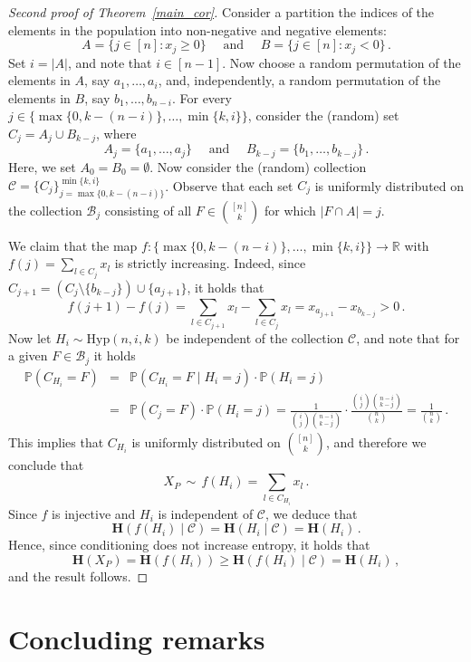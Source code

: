 \documentclass[11pt]{article}
\newcommand{\Prb}{\mathbb{P}}
\newcommand{\bh}{\mathbf{H}}
\begin{document}
\begin{proof}[Second proof of Theorem~\ref{main_cor}]
Consider a partition the indices of the elements in the population into non-negative and negative elements:
\[
A=\{j\in [n]: x_j \ge 0\} \quad\text{ and }\quad B = \{j\in [n] : x_j < 0\} \, .
\]
Set $i=|A|$, and note that $i\in [n-1]$. 
Now choose a random permutation of the elements in $A$, say $a_1,\ldots,a_i$, and, independently, a random permutation of the elements in $B$, say $b_1,\ldots,b_{n-i}$. 
For every $j\in\{\max\{0,k-(n-i)\},\dots,\min\{k,i\}\}$, consider the (random) set $C_j = A_j \cup B_{k-j}$, where 
\[
A_j = \{a_1,\ldots,a_j\} \quad \text{ and } \quad B_{k-j}=\{b_1,\ldots,b_{k-j}\} \, .
\]
Here, we set $A_0=B_{0}=\emptyset$.  
Now consider the (random) collection $\mathcal{C}= \{C_j\}_{j=\max\{0,k-(n-i)\}}^{\min\{k,i\}}$. 
Observe that each set $C_j$ is uniformly distributed on the collection 
$\mathcal{B}_j$ consisting of all $F\in\binom{[n]}{k}$ for which 
$|F\cap A|=j$. 

We claim that the map $f: \{\max\{0,k-(n-i)\},\dots,\min\{k,i\}\}\to \mathbb{R}$ with 
$f(j)= \sum_{l\in C_j}x_l$ is strictly increasing. Indeed, since $C_{j+1} = (C_j\setminus \{b_{k-j}\})\cup \{a_{j+1}\}$, it holds that 
\[
f(j+1)-f(j)=\sum_{l\in C_{j+1}}x_l - \sum_{l\in C_j}x_l = x_{a_{j+1}} - x_{b_{k-j}} > 0 \, .
\]
Now let $H_i\sim\text{Hyp}(n,i,k)$ be independent of the collection $\mathcal{C}$, and note that  for a given $F\in\mathcal{B}_j$ it holds 
\begin{eqnarray*}
\Prb(C_{H_i} = F) &=& \Prb(C_{H_i}= F \mid H_i=j)\cdot \Prb(H_i=j)\\ 
&=&  \Prb(C_{j}= F)\cdot \Prb(H_i=j)
 = \frac{1}{\binom{i}{j}\binom{n-i}{k-j}}\cdot \frac{\binom{i}{j}\binom{n-i}{k-j}}{\binom{n}{k}} = \frac{1}{\binom{n}{k}} \, .
\end{eqnarray*}
This implies that $C_{H_i}$ is uniformly distributed on $\binom{[n]}{k}$, and therefore we conclude that  
\[
X_P \,\sim\, f(H_i)= \sum_{l \in C_{H_i}}x_l \, .
\]
Since $f$ is injective and $H_i$ is independent of $\mathcal{C}$, we deduce that 
\[
\bh(f(H_i)\mid \mathcal{C}) = \bh(H_i\mid \mathcal{C}) = \bh(H_i) \, .
\]
Hence, since conditioning does not increase entropy, it holds that  
\[
\bh(X_P) = \bh(f(H_i)) \ge \bh(f(H_i)\mid \mathcal{C}) = \bh(H_i) \, ,
\]
and the result follows. 
\end{proof}





\section{Concluding remarks}\label{concluding_remarks}
\end{document}
